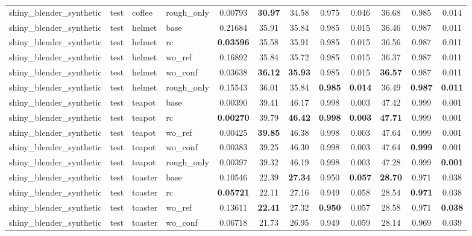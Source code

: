 \begin{table}[t]
{\begin{tabular}{llllcccccccc}
shiny\_blender\_synthetic & test & coffee & rough\_only & 0.00793 & \textbf{30.97} & 34.58 & 0.975 & 0.046 & 36.68 & 0.985 & 0.014 \\
shiny\_blender\_synthetic & test & helmet & base & 0.21684 & 35.91 & 35.84 & 0.985 & 0.015 & 36.46 & 0.987 & 0.011 \\
shiny\_blender\_synthetic & test & helmet & rc & \textbf{0.03596} & 35.58 & 35.91 & 0.985 & 0.015 & 36.56 & 0.987 & 0.011 \\
shiny\_blender\_synthetic & test & helmet & wo\_ref & 0.16892 & 35.84 & 35.72 & 0.985 & 0.015 & 36.37 & 0.987 & 0.011 \\
shiny\_blender\_synthetic & test & helmet & wo\_conf & 0.03638 & \textbf{36.12} & \textbf{35.93} & 0.985 & 0.015 & \textbf{36.57} & 0.987 & 0.011 \\
shiny\_blender\_synthetic & test & helmet & rough\_only & 0.15543 & 36.01 & 35.84 & \textbf{0.985} & \textbf{0.014} & 36.49 & \textbf{0.987} & \textbf{0.011} \\
shiny\_blender\_synthetic & test & teapot & base & 0.00390 & 39.41 & 46.17 & 0.998 & 0.003 & 47.42 & 0.999 & 0.001 \\
shiny\_blender\_synthetic & test & teapot & rc & \textbf{0.00270} & 39.79 & \textbf{46.42} & \textbf{0.998} & \textbf{0.003} & \textbf{47.71} & 0.999 & 0.001 \\
shiny\_blender\_synthetic & test & teapot & wo\_ref & 0.00425 & \textbf{39.85} & 46.38 & 0.998 & 0.003 & 47.64 & 0.999 & 0.001 \\
shiny\_blender\_synthetic & test & teapot & wo\_conf & 0.00383 & 39.25 & 46.30 & 0.998 & 0.003 & 47.64 & \textbf{0.999} & 0.001 \\
shiny\_blender\_synthetic & test & teapot & rough\_only & 0.00397 & 39.32 & 46.19 & 0.998 & 0.003 & 47.28 & 0.999 & \textbf{0.001} \\
shiny\_blender\_synthetic & test & toaster & base & 0.10546 & 22.39 & \textbf{27.34} & 0.950 & \textbf{0.057} & \textbf{28.70} & 0.971 & 0.038 \\
shiny\_blender\_synthetic & test & toaster & rc & \textbf{0.05721} & 22.11 & 27.16 & 0.949 & 0.058 & 28.54 & \textbf{0.971} & 0.038 \\
shiny\_blender\_synthetic & test & toaster & wo\_ref & 0.13611 & \textbf{22.41} & 27.32 & \textbf{0.950} & 0.057 & 28.58 & 0.971 & \textbf{0.038} \\
shiny\_blender\_synthetic & test & toaster & wo\_conf & 0.06718 & 21.73 & 26.95 & 0.949 & 0.059 & 28.14 & 0.969 & 0.039 \\

\end{tabular}}
\end{table}
